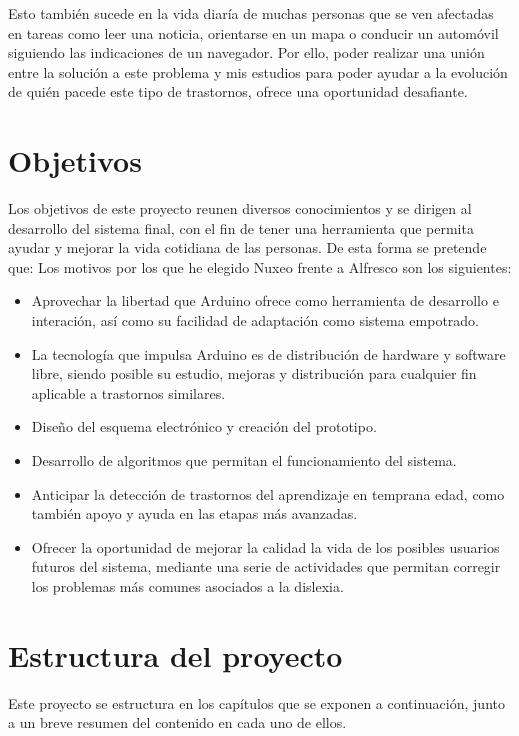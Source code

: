 Esto también sucede en la vida diaría de muchas personas que se ven afectadas en tareas como leer una noticia, orientarse en un mapa o conducir un automóvil siguiendo las indicaciones de un navegador. Por ello, poder realizar una unión entre la solución a este problema y mis estudios para poder ayudar a la evolución de quién pacede este tipo de trastornos, ofrece una oportunidad desafiante. 

\section{Objetivos}
Los objetivos de este proyecto reunen diversos conocimientos y se dirigen al desarrollo del sistema final, con el fin de tener una herramienta que permita ayudar y mejorar la vida cotidiana de las personas. De esta forma se pretende que: 
Los motivos por los que he elegido Nuxeo frente a Alfresco son los siguientes:

\begin{itemize}
	\item Aprovechar la libertad que Arduino ofrece como herramienta de desarrollo e interación, así como su facilidad de adaptación como sistema empotrado.
	\item La tecnología que impulsa Arduino es de distribución de hardware y software libre, siendo posible su estudio, mejoras y distribución para cualquier fin aplicable a trastornos similares.
	\item Diseño del esquema electrónico y creación del prototipo.
	\item Desarrollo de algoritmos que permitan el funcionamiento del sistema.
	\item Anticipar la detección de trastornos del aprendizaje en temprana edad, como también apoyo y ayuda en las etapas más avanzadas.
	\item Ofrecer la oportunidad de mejorar la calidad la vida de los posibles usuarios futuros del sistema, mediante una serie de actividades que permitan corregir los problemas más comunes asociados a la dislexia.
\end{itemize}

\section{Estructura del proyecto}
Este proyecto se estructura en los capítulos que se exponen a continuación, junto a un breve resumen del contenido en cada uno de ellos.
\\

